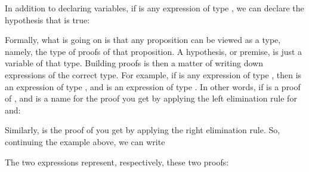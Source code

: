 \documentclass[letterpaper,10pt,english]{sphinxmanual}
\begin{document}
\sphinxAtStartPar
In addition to declaring variables, if  is any expression of type , we can declare the hypothesis that  is true:

\begin{sphinxVerbatim}[commandchars=\\\{\}]
      

 
\end{sphinxVerbatim}

\sphinxAtStartPar
Formally, what is going on is that any proposition can be viewed as a type, namely, the type of proofs of that proposition. A hypothesis, or premise, is just a variable of that type. Building proofs is then a matter of writing down expressions of the correct type. For example, if  is any expression of type , then  is an expression of type , and  is an expression of type . In other words, if  is a proof of , and  is a name for the proof you get by applying the left elimination rule for and:



\begin{center}
\AXM{\vdots}
\noLine
{}
\noLine
\UIM{\vdots}
\noLine
{}
\DP
\end{center}

\sphinxAtStartPar
Similarly,  is the proof of  you get by applying the right elimination rule. So, continuing the example above, we can write

\begin{sphinxVerbatim}[commandchars=\\\{\}]
      

  
  
\end{sphinxVerbatim}

\sphinxAtStartPar
The two expressions represent, respectively, these two proofs:
\end{document}
